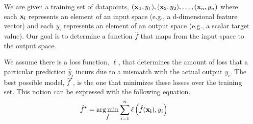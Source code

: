\documentclass[assignment02_Solutions]{subfiles}
\begin{document}
\begin{recall}
We are given a training set of datapoints, $(\mathbf{x_1}, y_1), (\mathbf{x}_2, y_2), \ldots, (\mathbf{x}_n, y_n)$ where each $\mathbf{x_i}$ represents an element of an input space (e.g., a d-dimensional feature vector) and each $y_i$ represents an element of an output space (e.g., a scalar target value).  Our goal is to determine a function $\hat{f}$ that maps from the input space to the output space.

We assume there is a loss function, $\ell$, that determines the amount of loss that a particular prediction $\hat{y}_i$ incurs due to a mismatch with the actual output $y_i$.  The best possible model, $\hat{f}^\star$, is the one that minimizes these losses over the training set.  This notion can be expressed with the following equation.
\begin{align}
\hat{f}^\star &= \operatorname*{arg\,min}_{\hat{f}} \sum_{i=1}^n \ell \left ( \hat{f}(\mathbf{x_i}), y_i \right )
\end{align} 

\end{recall}

\vspace{1em}
\end{document}
